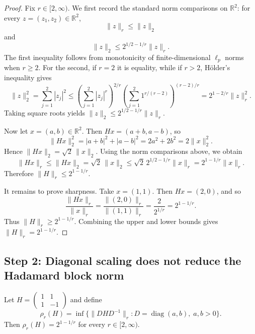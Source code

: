 \documentclass{article}
\begin{document}
\begin{proof}
Fix $r \in [2,\infty)$. We first record the standard norm comparisons on $\mathbb{R}^2$: for every $z=(z_1,z_2)\in\mathbb{R}^2$,
\[
\|z\|_r \le \|z\|_2
\]
and
\[
\|z\|_2 \le 2^{1/2-1/r}\|z\|_r.
\]
The first inequality follows from monotonicity of finite-dimensional $\ell_p$ norms when $r\ge 2$. For the second, if $r=2$ it is equality, while if $r>2$, H\"older's inequality gives
\[
\|z\|_2^2
=\sum_{j=1}^2 |z_j|^2
\le \left(\sum_{j=1}^2 |z_j|^r\right)^{2/r}
\left(\sum_{j=1}^2 1^{r/(r-2)}\right)^{(r-2)/r}
=2^{1-2/r}\|z\|_r^2.
\]
Taking square roots yields $\|z\|_2 \le 2^{1/2-1/r}\|z\|_r$.

Now let $x=(a,b)\in\mathbb{R}^2$. Then $Hx=(a+b,a-b)$, so
\[
\|Hx\|_2^2 = |a+b|^2+|a-b|^2 = 2a^2+2b^2 = 2\|x\|_2^2.
\]
Hence $\|Hx\|_2=\sqrt{2}\,\|x\|_2$. Using the norm comparisons above, we obtain
\[
\|Hx\|_r \le \|Hx\|_2 = \sqrt{2}\,\|x\|_2 \le \sqrt{2}\,2^{1/2-1/r}\|x\|_r = 2^{1-1/r}\|x\|_r.
\]
Therefore $\|H\|_r\le 2^{1-1/r}$.

It remains to prove sharpness. Take $x=(1,1)$. Then $Hx=(2,0)$, and so
\[
\frac{\|Hx\|_r}{\|x\|_r} = \frac{\|(2,0)\|_r}{\|(1,1)\|_r} = \frac{2}{2^{1/r}} = 2^{1-1/r}.
\]
Thus $\|H\|_r\ge 2^{1-1/r}$. Combining the upper and lower bounds gives $\|H\|_r=2^{1-1/r}$.
\end{proof}

\subsection*{Step 2: Diagonal scaling does not reduce the Hadamard block norm}

\begin{lemma}\label{lem:rho-hadamard}
Let $H = \begin{pmatrix} 1 & 1 \\ 1 & -1 \end{pmatrix}$ and define
\[
\rho_r(H) = \inf\{\|DHD^{-1}\|_r : D = \operatorname{diag}(a,b),\; a,b>0\}.
\]
Then $\rho_r(H) = 2^{1-1/r}$ for every $r \in [2,\infty)$.
\end{lemma}
\end{document}
